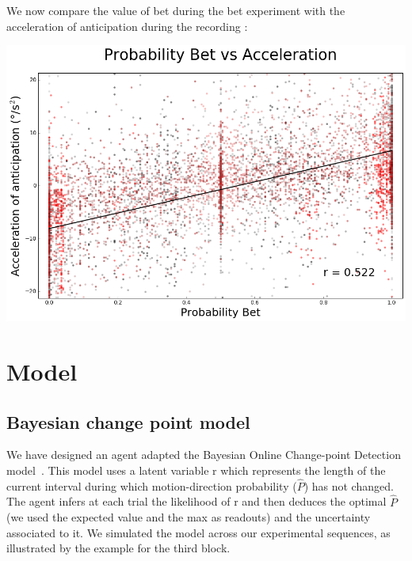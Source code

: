 \documentclass[profile,final,english, draft]{article}%
\begin{document}
We now compare the value of bet during the bet experiment with the acceleration of anticipation during the recording :


\begin{center} 
    \includegraphics[width=1\linewidth]{p_bet--v_a}
\end{center}


\section*{Model}

\subsection*{Bayesian change point model}

We have designed an agent adapted the Bayesian Online Change-point Detection model~\parencite{AdamsMackay2007}. This model uses a latent variable r which represents the length of the current interval during which motion-direction probability ($\hat{P}$) has not changed. The agent infers at each trial the likelihood  of r and then deduces the optimal $\hat{P}$ (we used the expected value and the max as readouts) and the uncertainty associated to it. We simulated the model across our experimental sequences, as illustrated by the example for the third block.
\end{document}
